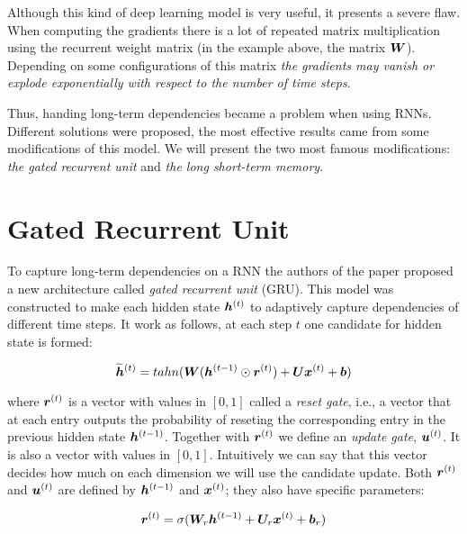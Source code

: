 Although this kind of deep learning model is very useful, it presents a severe flaw. When computing the gradients there is a lot of repeated matrix multiplication using the recurrent weight matrix (in the example above, the matrix $\bm{W}$). Depending on some configurations of this matrix \textit{the gradients may vanish or explode exponentially with respect to the number of time steps}.

Thus, handing long-term dependencies became a problem when using RNNs. Different solutions were proposed, the most effective results came from some modifications of this model. We will present the two most famous modifications: \textit{the gated recurrent unit} and \textit{the long short-term memory}. 


\section{Gated Recurrent Unit}
\label{sec:GRU}

To capture long-term dependencies on a RNN  the authors of the paper \cite{ChungGCB14}  proposed a new architecture called \textit{gated recurrent unit} (GRU). This model was constructed to make each hidden state  $\bm{h}^{(t)}$ to adaptively capture dependencies of different time steps. It work as follows, at each step $t$ one candidate for hidden state is formed:

\begin{equation}
\bm{\widetilde{h}}^{(t)} = tahn(\bm{W} (\bm{h}^{(t-1)} \odot  \bm{r}^{(t)}) + \bm{U} \bm{x}^{(t)} + \bm{b})
\end{equation}

where $\bm{r}^{(t)}$ is a vector with values in $[0, 1]$ called a \textit{reset gate}, i.e.,  a vector that at each entry outputs the probability of reseting the  corresponding entry in the previous hidden state $\bm{h}^{(t-1)}$. Together with $\bm{r}^{(t)}$ we define an \textit{update gate}, $\bm{u}^{(t)}$. It is also a vector with values in $[0, 1]$. Intuitively we can say that this vector decides how much on each dimension we will use the candidate update. Both $\bm{r}^{(t)}$ and $\bm{u}^{(t)}$ are defined by $\bm{h}^{(t-1)}$ and $\bm{x}^{(t)}$; they also have specific parameters:

\begin{equation}
\bm{r}^{(t)} = \sigma(\bm{W}_{r} \bm{h}^{(t-1)} + \bm{U}_{r} \bm{x}^{(t)} + \bm{b}_{r})
\end{equation}


